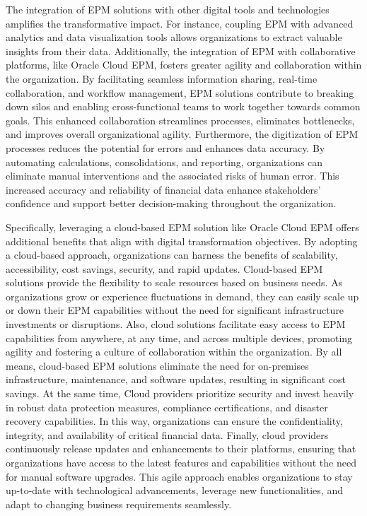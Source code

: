 \documentclass[12pt,a4paper,openright,twoside]{book}
\begin{document}
The integration of EPM solutions with other digital tools and technologies amplifies the transformative impact. 
%
For instance, coupling EPM with advanced analytics and data visualization tools allows organizations to extract valuable insights from their data.
%
Additionally, the integration of EPM with collaborative platforms, like Oracle Cloud EPM, fosters greater agility and collaboration within the organization. 
%
By facilitating seamless information sharing, real-time collaboration, and workflow management, EPM solutions contribute to breaking down silos and enabling cross-functional teams to work together towards common goals. 
%
This enhanced collaboration streamlines processes, eliminates bottlenecks, and improves overall organizational agility.
%
Furthermore, the digitization of EPM processes reduces the potential for errors and enhances data accuracy. 
%
By automating calculations, consolidations, and reporting, organizations can eliminate manual interventions and the associated risks of human error. 
%
This increased accuracy and reliability of financial data enhance stakeholders' confidence and support better decision-making throughout the organization.

Specifically, leveraging a cloud-based EPM solution like Oracle Cloud EPM offers additional benefits that align with digital transformation objectives. 
%
By adopting a cloud-based approach, organizations can harness the benefits of scalability, accessibility, cost savings, security, and rapid updates. 
%
Cloud-based EPM solutions provide the flexibility to scale resources based on business needs. 
%
As organizations grow or experience fluctuations in demand, they can easily scale up or down their EPM capabilities without the need for significant infrastructure investments or disruptions. 
%
Also, cloud solutions facilitate easy access to EPM capabilities from anywhere, at any time, and across multiple devices, promoting agility and fostering a culture of collaboration within the organization.
%
By all means,  cloud-based EPM solutions eliminate the need for on-premises infrastructure, maintenance, and software updates, resulting in significant cost savings. 
%
At the same time, Cloud providers prioritize security and invest heavily in robust data protection measures, compliance certifications, and disaster recovery capabilities.
%
In this way, organizations can ensure the confidentiality, integrity, and availability of critical financial data.
%
Finally, cloud providers continuously release updates and enhancements to their platforms, ensuring that organizations have access to the latest features and capabilities without the need for manual software upgrades. 
%
This agile approach enables organizations to stay up-to-date with technological advancements, leverage new functionalities, and adapt to changing business requirements seamlessly.
\end{document}
